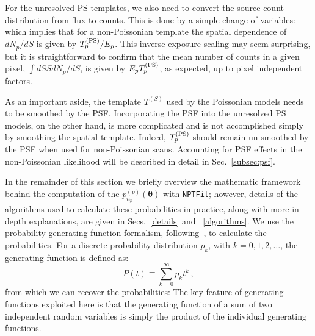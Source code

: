 For the unresolved PS templates, we also need to convert the source-count distribution from flux to counts.  This is done by a simple change of variables:
which implies that for a non-Poissonian template the spatial dependence of $dN_p/dS$ is given by $T^{({\rm PS})}_p/E_p$. This inverse exposure scaling may seem surprising, but it is straightforward to confirm that the mean number of counts in a given pixel, $ \int dS S dN_p / dS$, is given by $E_p T^{({\rm PS})}_p$, as expected, up to pixel independent factors.

As an important aside, the template $T^{(S)}$ used by the Poissonian models needs to be smoothed by the PSF.  Incorporating the PSF into the unresolved PS models, on the other hand, is more complicated and is not accomplished simply by smoothing the spatial template.  Indeed, $T^{({\rm PS})}_p$ should remain un-smoothed by the PSF when used for non-Poissonian scans. Accounting for PSF effects in the non-Poissonian likelihood will be described in detail in Sec.~\ref{subsec:psf}.

In the remainder of this section we briefly overview the mathematic framework behind the computation of the $p_{n_p}^{(p)}({\bm \theta})$ with \texttt{NPTFit}; however, details of the algorithms used to calculate these probabilities in practice, along with more in-depth explanations, are given in Secs.~\ref{details} and ~\ref{algorithms}.  We use the probability generating function formalism, following~\cite{Malyshev:2011zi}, to calculate the probabilities.   
For a discrete probability distribution $p_k$, with $k=0,1,2,\ldots$, the generating function is defined as:
\begin{equation}
P(t) \equiv \sum_{k=0}^{\infty} p_k t^k \,,
\label{prob-gen}
\end{equation}
from which we can recover the probabilities:
The key feature of generating functions exploited here is that the generating function of a sum of two independent random variables is simply the product of the individual generating functions. 

